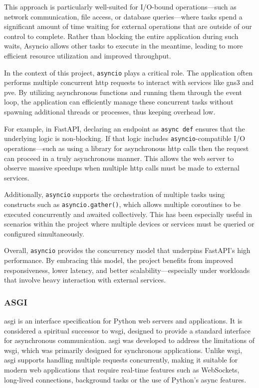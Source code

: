 This approach is particularly well-suited for I/O-bound operations—such as network communication, file access, or database 
queries—where tasks spend a significant amount of time waiting for external operations that are outside of our control to 
complete. Rather than blocking the entire application during such waits, Asyncio allows other tasks to execute in the 
meantime, leading to more efficient resource utilization and improved throughput.

In the context of this project, \texttt{asyncio} plays a critical role. The application often performs multiple concurrent 
\ac{http} requests to interact with services like \ac{gns3} and \ac{pve}. By utilizing asynchronous functions and running 
them through the event loop, the application can efficiently manage these concurrent tasks without spawning additional 
threads or processes, thus keeping overhead low.

For example, in FastAPI, declaring an endpoint as \texttt{async def} ensures that the underlying logic is non-blocking. 
If that logic includes \texttt{asyncio}-compatible I/O operations—such as using a library for asynchronous \ac{http} calls 
then the request can proceed in a truly asynchronous manner. This allows the web server to observe massive speedups when
multiple \ac{http} calls must be made to external services.

Additionally, \texttt{asyncio} supports the orchestration of multiple tasks using constructs such as \texttt{asyncio.gather()}, 
which allows multiple coroutines to be executed concurrently and awaited collectively. This has been especially useful in 
scenarios within the project where multiple devices or services must be queried or configured simultaneously.

Overall, \texttt{asyncio} provides the concurrency model that underpins FastAPI's high performance. By embracing this model, 
the project benefits from improved responsiveness, lower latency, and better scalability—especially under workloads that 
involve heavy interaction with external services.


\subsubsection{ASGI}

\ac{asgi} is an interface specification for Python web servers and applications. It is considered a spiritual successor to 
\ac{wsgi}, designed to provide a standard interface for asynchronous communication. \ac{asgi} was developed to address the 
limitations of \ac{wsgi}, which was primarily designed for synchronous applications. Unlike \ac{wsgi}, \ac{asgi} supports 
handling multiple requests concurrently, making it suitable for modern web applications that require real-time features such 
as WebSockets, long-lived connections, background tasks or the use of Python's async features.

